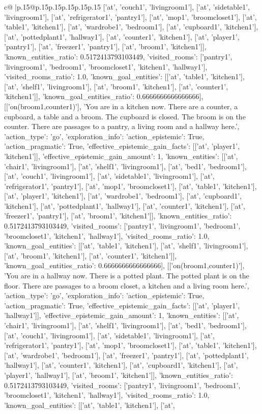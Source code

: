 \documentclass{article}
\begin{document}
{\begin{supertabular}{c@{$\;$}|p{.15\linewidth}@{}p{.15\linewidth}p{.15\linewidth}p{.15\linewidth}p{.15\linewidth}p{.15\linewidth}}
{{{['at', 'couch1', 'livingroom1'], ['at', 'sidetable1', 'livingroom1'], ['at', 'refrigerator1', 'pantry1'], ['at', 'mop1', 'broomcloset1'], ['at', 'table1', 'kitchen1'], ['at', 'wardrobe1', 'bedroom1'], ['at', 'cupboard1', 'kitchen1'], ['at', 'pottedplant1', 'hallway1'], ['at', 'counter1', 'kitchen1'], ['at', 'player1', 'pantry1'], ['at', 'freezer1', 'pantry1'], ['at', 'broom1', 'kitchen1']], 'known_entities_ratio': 0.5172413793103449, 'visited_rooms': ['pantry1', 'livingroom1', 'bedroom1', 'broomcloset1', 'kitchen1', 'hallway1'], 'visited_rooms_ratio': 1.0, 'known_goal_entities': [['at', 'table1', 'kitchen1'], ['at', 'shelf1', 'livingroom1'], ['at', 'broom1', 'kitchen1'], ['at', 'counter1', 'kitchen1']], 'known_goal_entities_ratio': 0.6666666666666666}}], [['on(broom1,counter1)'], 'You are in a kitchen now. There are a counter, a cupboard, a table and a broom. The cupboard is closed. The broom is on the counter. There are passages to a pantry, a living room and a hallway here.', {'action_type': 'go', 'exploration_info': {'action_epistemic': True, 'action_pragmatic': True, 'effective_epistemic_gain_facts': [['at', 'player1', 'kitchen1']], 'effective_epistemic_gain_amount': 1, 'known_entities': [['at', 'chair1', 'livingroom1'], ['at', 'shelf1', 'livingroom1'], ['at', 'bed1', 'bedroom1'], ['at', 'couch1', 'livingroom1'], ['at', 'sidetable1', 'livingroom1'], ['at', 'refrigerator1', 'pantry1'], ['at', 'mop1', 'broomcloset1'], ['at', 'table1', 'kitchen1'], ['at', 'player1', 'kitchen1'], ['at', 'wardrobe1', 'bedroom1'], ['at', 'cupboard1', 'kitchen1'], ['at', 'pottedplant1', 'hallway1'], ['at', 'counter1', 'kitchen1'], ['at', 'freezer1', 'pantry1'], ['at', 'broom1', 'kitchen1']], 'known_entities_ratio': 0.5172413793103449, 'visited_rooms': ['pantry1', 'livingroom1', 'bedroom1', 'broomcloset1', 'kitchen1', 'hallway1'], 'visited_rooms_ratio': 1.0, 'known_goal_entities': [['at', 'table1', 'kitchen1'], ['at', 'shelf1', 'livingroom1'], ['at', 'broom1', 'kitchen1'], ['at', 'counter1', 'kitchen1']], 'known_goal_entities_ratio': 0.6666666666666666}}], [['on(broom1,counter1)'], 'You are in a hallway now. There is a potted plant. The potted plant is on the floor. There are passages to a broom closet, a kitchen and a living room here.', {'action_type': 'go', 'exploration_info': {'action_epistemic': True, 'action_pragmatic': True, 'effective_epistemic_gain_facts': [['at', 'player1', 'hallway1']], 'effective_epistemic_gain_amount': 1, 'known_entities': [['at', 'chair1', 'livingroom1'], ['at', 'shelf1', 'livingroom1'], ['at', 'bed1', 'bedroom1'], ['at', 'couch1', 'livingroom1'], ['at', 'sidetable1', 'livingroom1'], ['at', 'refrigerator1', 'pantry1'], ['at', 'mop1', 'broomcloset1'], ['at', 'table1', 'kitchen1'], ['at', 'wardrobe1', 'bedroom1'], ['at', 'freezer1', 'pantry1'], ['at', 'pottedplant1', 'hallway1'], ['at', 'counter1', 'kitchen1'], ['at', 'cupboard1', 'kitchen1'], ['at', 'player1', 'hallway1'], ['at', 'broom1', 'kitchen1']], 'known_entities_ratio': 0.5172413793103449, 'visited_rooms': ['pantry1', 'livingroom1', 'bedroom1', 'broomcloset1', 'kitchen1', 'hallway1'], 'visited_rooms_ratio': 1.0, 'known_goal_entities': [['at', 'table1', 'kitchen1'], ['at', }}}
\end{supertabular}}
\end{document}
